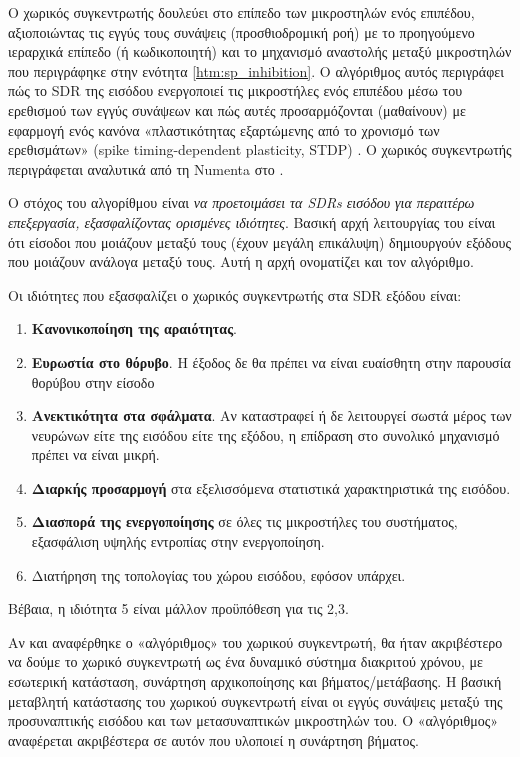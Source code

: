 Ο χωρικός συγκεντρωτής δουλεύει στο επίπεδο των μικροστηλών ενός επιπέδου, αξιοποιώντας τις εγγύς τους συνάψεις (προσθιοδρομική ροή)
με το προηγούμενο ιεραρχικά επίπεδο (ή κωδικοποιητή) και το μηχανισμό αναστολής μεταξύ μικροστηλών που περιγράφηκε στην ενότητα \ref{htm:sp_inhibition}.
Ο αλγόριθμος αυτός περιγράφει πώς το SDR της εισόδου ενεργοποιεί τις μικροστήλες ενός επιπέδου μέσω του ερεθισμού των εγγύς συνάψεων
και πώς αυτές προσαρμόζονται (μαθαίνουν) με εφαρμογή ενός κανόνα «πλαστικότητας εξαρτώμενης από το χρονισμό των ερεθισμάτων» (spike timing-dependent plasticity, STDP)
\parencite{songCompetitiveHebbianLearning2000}.
Ο χωρικός συγκεντρωτής περιγράφεται αναλυτικά από τη Numenta στο \cite{cuiHTMSpatialPooler2017}.

Ο στόχος του αλγορίθμου είναι \textit{να προετοιμάσει τα SDRs εισόδου για περαιτέρω επεξεργασία, εξασφαλίζοντας ορισμένες ιδιότητες}.
Βασική αρχή λειτουργίας του είναι ότι είσοδοι που μοιάζουν μεταξύ τους (έχουν μεγάλη επικάλυψη) δημιουργούν εξόδους που μοιάζουν ανάλογα μεταξύ τους.
Αυτή η αρχή ονοματίζει και τον αλγόριθμο.

Οι ιδιότητες που εξασφαλίζει ο χωρικός συγκεντρωτής στα SDR εξόδου είναι:
\begin{enumerate}
	\item \textbf{Κανονικοποίηση της αραιότητας}.
	\item \textbf{Ευρωστία στο θόρυβο}. Η έξοδος δε θα πρέπει να είναι ευαίσθητη στην παρουσία θορύβου στην είσοδο
	\item \textbf{Ανεκτικότητα στα σφάλματα}. Αν καταστραφεί ή δε λειτουργεί σωστά μέρος των νευρώνων είτε της εισόδου είτε της εξόδου, η επίδραση στο συνολικό μηχανισμό πρέπει να είναι μικρή.
	\item \textbf{Διαρκής προσαρμογή} στα εξελισσόμενα στατιστικά χαρακτηριστικά της εισόδου.
	\item \textbf{Διασπορά της ενεργοποίησης} σε όλες τις μικροστήλες του συστήματος, εξασφάλιση υψηλής εντροπίας στην ενεργοποίηση.
	\item Διατήρηση της τοπολογίας του χώρου εισόδου, εφόσον υπάρχει.
\end{enumerate}
Βέβαια, η ιδιότητα 5 είναι μάλλον προϋπόθεση για τις 2,3.

Αν και αναφέρθηκε ο «αλγόριθμος» του χωρικού συγκεντρωτή, θα ήταν ακριβέστερο να δούμε το χωρικό συγκεντρωτή ως ένα δυναμικό σύστημα διακριτού χρόνου,
με εσωτερική κατάσταση, συνάρτηση αρχικοποίησης και βήματος/μετάβασης.
Η βασική μεταβλητή κατάστασης του χωρικού συγκεντρωτή είναι οι εγγύς συνάψεις μεταξύ της προσυναπτικής εισόδου και των μετασυναπτικών μικροστηλών του.
Ο «αλγόριθμος» αναφέρεται ακριβέστερα σε αυτόν που υλοποιεί η συνάρτηση βήματος.

